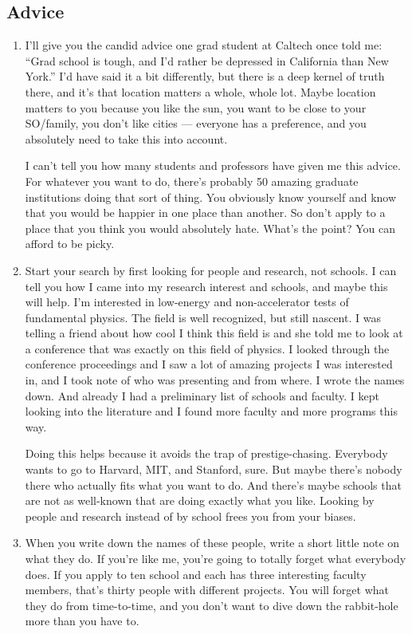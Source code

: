 \documentclass[12pt]{article}
\begin{document}
\subsection{Advice}
\begin{enumerate}
	\item I'll give you the candid advice one grad student at Caltech once told me: ``Grad school is tough, and I'd rather be depressed in California than New York.'' I'd have said it a bit differently, but there is a deep kernel of truth there, and it's that location matters a whole, whole lot. Maybe location matters to you because you like the sun, you want to be close to your SO/family, you don't like cities --- everyone has a preference, and you absolutely need to take this into account.

	I can't tell you how many students and professors have given me this advice. For whatever you want to do, there's probably 50 amazing graduate institutions doing that sort of thing. You obviously know yourself and know that you would be happier in one place than another. So don't apply to a place that you think you would absolutely hate. What's the point? You can afford to be picky. 

	\item Start your search by first looking for people and research, not schools. I can tell you how I came into my research interest and schools, and maybe this will help. I'm interested in low-energy and non-accelerator tests of fundamental physics. The field is well recognized, but still nascent. I was telling a friend about how cool I think this field is and she told me to look at a conference that was exactly on this field of physics. I looked through the conference proceedings and I saw a lot of amazing projects I was interested in, and I took note of who was presenting and from where. I wrote the names down. And already I had a preliminary list of schools and faculty. I kept looking into the literature and I found more faculty and more programs this way.

	Doing this helps because it avoids the trap of prestige-chasing. Everybody wants to go to Harvard, MIT, and Stanford, sure. But maybe there's nobody there who actually fits what you want to do. And there's maybe schools that are not as well-known that are doing exactly what you like. Looking by people and research instead of by school frees you from your biases.

	\item When you write down the names of these people, write a short little note on what they do. If you're like me, you're going to totally forget what everybody does. If you apply to ten school and each has three interesting faculty members, that's thirty people with different projects. You will forget what they do from time-to-time, and you don't want to dive down the rabbit-hole more than you have to. 


\end{enumerate}
\end{document}
